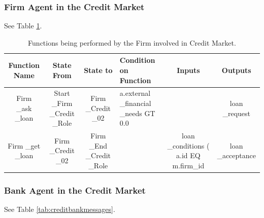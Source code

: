 \subsubsection{Firm Agent in the Credit Market}

See Table \ref{tab:creditbankfn}.

\begin{landscape}
\begin{table}[!htb]\caption{Functions being performed by the Firm involved in Credit Market.}
\begin{center}
\begin{tabular}{|c|c|c|l|c|c|}
\hline
Function Name & State From & State to & Condition on Function & Inputs & Outputs \\
\hline {\parbox[l]{3cm}{Firm \_ask \_loan}}& {\parbox[l]{3cm}{Start
\_Firm \_Credit \_Role}}& {\parbox[l]{3cm}{Firm \_Credit \_02}}&
{\parbox[l]{3cm}{a.external \_financial \_needs GT 0.0}} & &loan
\_request
\\
\hline

{\parbox[l]{3cm}{Firm \_get \_loan}}& {\parbox[l]{3cm}{Firm \_Credit
\_02}}& {\parbox[l]{3cm}{Firm \_End \_Credit \_Role}}&
&{\parbox[l]{3cm}{loan \_conditions ( a.id EQ m.firm\_id}} &
{\parbox[l]{3cm}{loan \_acceptance}}\\
\hline


\end{tabular}\end{center}\label{tab:creditbankfn}
\end{table}
\end{landscape}

\subsubsection{Bank Agent in the Credit Market}

See Table \ref{tab:creditbankmessages}.

